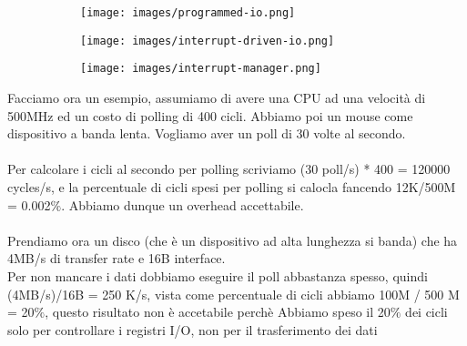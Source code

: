 \begin{figure}[h!]
    \centering
    \begin{subfigure}{.32\textwidth}
        \centering
        \texttt{[image: images/programmed-io.png]}
        \caption{}
    \end{subfigure}
    \begin{subfigure}{.32\textwidth}
        \centering
        \texttt{[image: images/interrupt-driven-io.png]}
        \caption{}
    \end{subfigure}
    \begin{subfigure}{.32\textwidth}
        \centering
        \texttt{[image: images/interrupt-manager.png]}
        \caption{}
    \end{subfigure}
\end{figure}

\begin{example}
    Facciamo ora un esempio, assumiamo di avere una CPU ad una velocità di 500MHz ed un costo di polling di 400 cicli. Abbiamo poi un mouse come dispositivo a banda lenta.
    Vogliamo aver un poll di 30 volte al secondo.\\\\
    Per calcolare i cicli al secondo per polling scriviamo (30 poll/s) * 400 = 120000 cycles/s, e la percentuale di cicli spesi
    per polling si calocla fancendo 12K/500M = 0.002\(\%\). Abbiamo dunque un overhead accettabile.\\\\
    Prendiamo ora un disco (che è un dispositivo ad alta lunghezza si banda) che ha 4MB/s di transfer rate e 16B interface.\\
    Per non mancare i dati dobbiamo eseguire il poll abbastanza spesso, quindi (4MB/s)/16B = 250 K/s, vista come percentuale di cicli
    abbiamo 100M / 500 M = 20\(\%\), questo risultato non è accetabile perchè Abbiamo speso il 20\(\%\) dei cicli solo per controllare i registri I/O, non per il trasferimento dei dati
\end{example}

